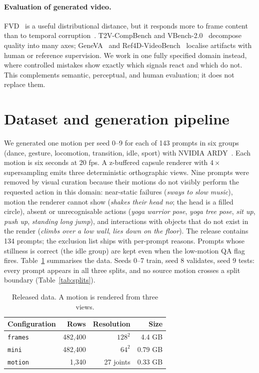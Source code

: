 \documentclass[10pt,twocolumn]{article}
\begin{document}
\paragraph{Evaluation of generated video.} FVD~\cite{unterthiner2018fvd} is a useful distributional distance,
but it responds more to frame content than to temporal corruption~\cite{ge2024fvdbias}. T2V-CompBench and
VBench-2.0~\cite{sun2025compbench,zheng2025vbench2} decompose quality into many axes; GeneVA~\cite{kang2026geneva}
and Ref4D-VideoBench~\cite{wei2026ref4d} localise artifacts with human or reference supervision. We work in one
fully specified domain instead, where controlled mistakes show exactly which signals react and which do not.
This complements semantic, perceptual, and human evaluation; it does not replace them.

\section{Dataset and generation pipeline}
We generated one motion per seed 0--9 for each of 143 prompts in six groups (dance, gesture, locomotion,
transition, idle, sport) with NVIDIA ARDY~\cite{zhao2026ardy}. Each motion is six seconds at 20 fps. A
z-buffered capsule renderer with $4\times$ supersampling emits three deterministic orthographic views. Nine
prompts were removed by visual curation because their motions do not visibly perform the requested action in
this domain: near-static failures (\emph{sways to slow music}), motion the renderer cannot show (\emph{shakes
their head no}; the head is a filled circle), absent or unrecognisable actions (\emph{yoga warrior pose},
\emph{yoga tree pose}, \emph{sit up}, \emph{push up}, \emph{standing long jump}), and interactions with objects
that do not exist in the render (\emph{climbs over a low wall}, \emph{lies down on the floor}). The release
contains 134 prompts; the exclusion list ships with per-prompt reasons. Prompts whose stillness is correct (the
idle group) are kept even when the low-motion QA flag fires. Table~\ref{tab:data} summarises the data. Seeds
0--7 train, seed 8 validates, seed 9 tests: every prompt appears in all three splits, and no source motion
crosses a split boundary (Table~\ref{tab:splits}).

\begin{table}[t]\centering\caption{Released data. A motion is rendered from three views.}\label{tab:data}\small
\begin{tabular}{@{}lrrr@{}}\toprule Configuration & Rows & Resolution & Size \\\midrule
\texttt{frames} & 482,400 & $128^2$ & 4.4 GB \\
\texttt{mini} & 482,400 & $64^2$ & 0.79 GB \\
\texttt{motion} & 1,340 & 27 joints & 0.33 GB \\\bottomrule\end{tabular}\end{table}
\end{document}
